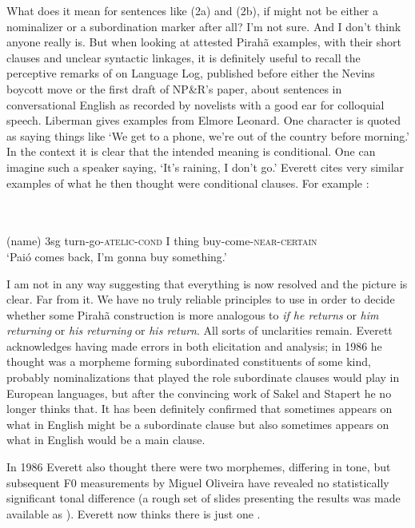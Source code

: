 \documentclass[output=paper,colorlinks,citecolor=brown
]{langscibook}
\begin{document}
What does it mean for sentences like (2a) and (2b), if \mbox{}
might not be either a nominalizer or a subordination marker after all?
I'm not sure. And I don't think anyone really is. But when looking at
attested Pirah{\~a} examples, with their short clauses and unclear
syntactic linkages, it is definitely useful to recall the perceptive
remarks of \citet{Liberman06} on Language Log, published before either
the Nevins boycott move or the first draft of NP\&R's paper, about
sentences in conversational English as recorded by novelists with a
good ear for colloquial speech. Liberman gives examples from Elmore
Leonard. One character is quoted as saying things like `We get to a
phone, we're out of the country before morning.' In the context it
is clear that the intended meaning is conditional. One can imagine
such a speaker saying, `It's raining, I don't go.' Everett cites very
similar examples of what he then thought were conditional clauses.
For example \citep[265, ex.~(241)]{Everett86HAL}:

\ea
{} \\
\gll {}      \\
     (name) 3sg turn-go-\textsc{atelic}-\textsc{cond} I thing buy-come-\textsc{near-certain}\\
\glt `Pai\'o comes back, I'm gonna buy something.'
\z

I am not in any way suggesting that everything is now resolved and
the picture is clear. Far from it. We have no truly reliable principles
to use in order to decide whether some Pirah{\~a} construction is
more analogous to \textit{if he returns} or \textit{him returning}
or \textit{his returning} or \textit{his return}. All sorts of
unclarities remain. Everett acknowledges having made errors in both
elicitation and analysis; in 1986 he thought \mbox{} was
a morpheme forming subordinated constituents of some kind, probably
nominalizations that played the role subordinate clauses would play
in European languages, but after the convincing work of Sakel and
Stapert he no longer thinks that. It has been definitely confirmed
that \mbox{} sometimes appears on what in English might
be a subordinate clause but also sometimes appears on what in English
would be a main clause.

In 1986 Everett also thought there were two \mbox{}
morphemes, differing in tone, but subsequent F0 measurements by Miguel
Oliveira have revealed no statistically significant tonal difference
(a rough set of slides presenting the results was made available as
\citealt{OlivEver10}). Everett now thinks there is just one
\mbox{}.
\end{document}
